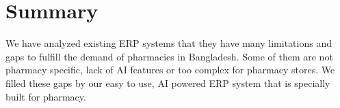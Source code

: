 \section{Summary}
We have analyzed existing ERP systems that they have many limitations and gaps to fulfill the demand of pharmacies in Bangladesh. Some of them are not pharmacy specific, lack of AI features or too complex for pharmacy stores. We filled these gaps by our easy to use, AI powered ERP system that is specially built for pharmacy.